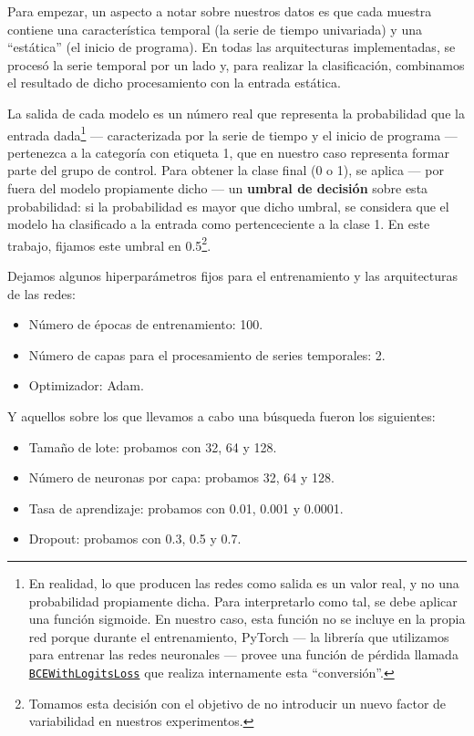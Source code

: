 \documentclass[../../main.tex]{subfiles}
\begin{document}
Para empezar, un aspecto a notar sobre nuestros datos es que cada muestra contiene una
característica temporal (la serie de tiempo univariada) y una ``estática'' (el inicio de
programa). En todas las arquitecturas implementadas, se procesó la serie temporal por un
lado y, para realizar la clasificación, combinamos el resultado de dicho procesamiento con
la entrada estática.

La salida de cada modelo es un número real que representa la probabilidad que la entrada
dada\footnote{En realidad, lo que producen las redes como salida es un valor real, y no
una probabilidad propiamente dicha. Para interpretarlo como tal, se debe aplicar una
función sigmoide. En nuestro caso, esta función no se incluye en la propia red porque
durante el entrenamiento, PyTorch — la librería que utilizamos para entrenar las redes
neuronales — provee una función de pérdida llamada
\href{https://pytorch.org/docs/stable/generated/torch.nn.BCEWithLogitsLoss.html}{\texttt{BCEWithLogitsLoss}}
que realiza internamente esta ``conversión''.} — caracterizada por la serie de tiempo y el
inicio de programa — pertenezca a la categoría con etiqueta 1, que en nuestro caso
representa formar parte del grupo de control. Para obtener la clase final (0 o 1), se
aplica — por fuera del modelo propiamente dicho — un \textbf{umbral de decisión} sobre
esta probabilidad: si la probabilidad es mayor que dicho umbral, se considera que el
modelo ha clasificado a la entrada como pertenceciente a la clase 1. En este trabajo,
fijamos este umbral en 0.5\footnote{Tomamos esta decisión con el objetivo de no introducir
un nuevo factor de variabilidad en nuestros experimentos.}.

Dejamos algunos hiperparámetros fijos para el entrenamiento y las arquitecturas de las redes:
\begin{itemize}[itemsep=0cm, topsep=0cm, parsep=0cm, partopsep=0cm]
    \item Número de épocas de entrenamiento: 100.
    \item Número de capas para el procesamiento de series temporales: 2.
    \item Optimizador: Adam.
\end{itemize}
Y aquellos sobre los que llevamos a cabo una búsqueda fueron los siguientes:
\begin{itemize}[itemsep=0cm, topsep=0cm, parsep=0cm, partopsep=0cm]
    \item Tamaño de lote: probamos con 32, 64 y 128.
    \item Número de neuronas por capa: probamos 32, 64 y 128.
    \item Tasa de aprendizaje: probamos con 0.01, 0.001 y 0.0001.
    \item Dropout: probamos con 0.3, 0.5 y 0.7.
\end{itemize}
\end{document}
